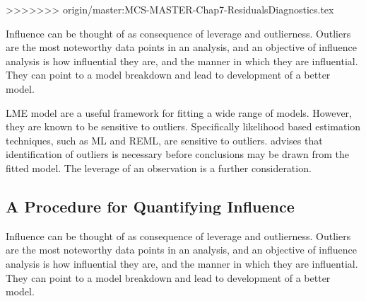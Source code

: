 \documentclass[12pt, a4paper]{report}
\theoremstyle{plain}
\theoremstyle{definition}
\theoremstyle{remark}
\begin{document}
>>>>>>> origin/master:MCS-MASTER-Chap7-ResidualsDiagnostics.tex

	
	
Influence can be thought of as consequence of leverage and outlierness. Outliers are the most noteworthy data points in an analysis, and an objective of influence analysis is how influential they are, and the manner in which they are influential. They can point to a model breakdown and lead to development of a better model.

LME model are a useful framework for fitting a wide range of models. However, they are known to be sensitive to outliers. Specifically likelihood based estimation techniques, such as ML and REML, are sensitive to outliers. \citet{Christensen} advises that identification of outliers is necessary before conclusions may be drawn from the fitted model. The leverage of an observation is a further consideration. 
	


	
%
%	
	
\subsection{A Procedure for Quantifying Influence}  
Influence can be thought of as consequence of leverage and outlierness. Outliers are the most noteworthy data points in an analysis, and an objective of influence analysis is how influential they are, and the manner in which they are influential. They can point to a model breakdown and lead to development of a better model. 
\end{document}
